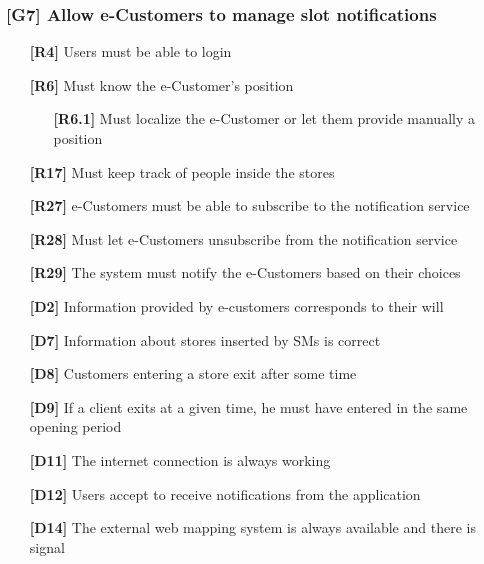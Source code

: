 \subsubsection{[G7] Allow e-Customers to manage slot notifications}
\begin{itemize}
	\setlength\itemsep{-1mm}
	\item [\textbf{[R4]}] Users must be able to login
	\item [\textbf{[R6]}] Must know the e-Customer’s position
	\begin{itemize}[itemsep=-1mm, topsep=-1mm]
		\item [\textbf{[R6.1]}] Must localize the e-Customer or let them provide manually a position
	\end{itemize}
	\item [\textbf{[R17]}] Must keep track of people inside the stores
	\item [\textbf{[R27]}] e-Customers must be able to subscribe to the notification service
	\item [\textbf{[R28]}] Must let e-Customers unsubscribe from the notification service
	\item [\textbf{[R29]}] The system must notify the e-Customers based on their choices
	\\
	\item [\textbf{[D2]}] Information provided by e-customers corresponds to their will
	\item [\textbf{[D7]}] Information about stores inserted by SMs is correct
	\item [\textbf{[D8]}] Customers entering a store exit after some time
	\item [\textbf{[D9]}] If a client exits at a given time, he must have entered in the same opening period
	\item [\textbf{[D11]}] The internet connection is always working
	\item [\textbf{[D12]}] Users accept to receive notifications from the application
	\item [\textbf{[D14]}] The external web mapping system is always available and there is signal
\end{itemize}